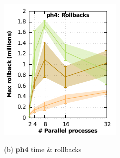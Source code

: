\begin{figure}
\begin{minipage}{0.5\linewidth}
\begin{minipage}{0.49\linewidth}
\includegraphics[width=\linewidth]{images/ph4_Delay_10_Evt_10_rollbacks}
\end{minipage}
\centerline{(b) \textbf{ph4} time \& rollbacks}    
\end{minipage}


\end{figure}
